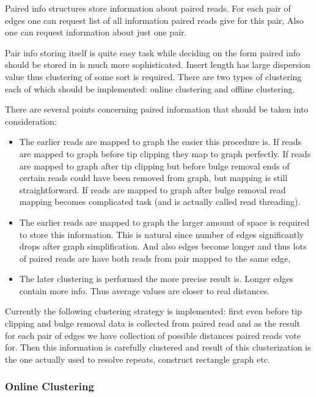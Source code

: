 \documentclass[12pt]{article}
\begin{document}
Paired info structures store information about paired reads. For each pair of edges one can request list of all information paired reads give for this pair, Also one can request information about just one pair.

Pair info storing itself is quite easy task while deciding on the form paired info should be stored in is much more sophisticated. Insert length has large dispersion value thus clustering of some sort is required. There are two types of clustering each of which should be implemented: online clustering and offline clustering.

There are several points concerning paired information that should be taken into consideration:

\begin{itemize}
\item The earlier reads are mapped to graph the easier this procedure is. If reads are mapped to graph before tip clipping they map to graph perfectly. If reads are mapped to graph after tip clipping but before bulge removal ends of certain reads could have been removed from graph, but mapping is still straightforward. If reads are mapped to graph after bulge removal read mapping becomes complicated task (and is actually called read threading).

\item The earlier reads are mapped to graph the larger amount of space is required to store this information. This is natural since number of edges significantly drops after graph simplification. And also edges become longer and thus lots of paired reads are have both reads from pair mapped to the same edge,

\item The later clustering is performed the more precise result is. Longer edges contain more info. Thus average values are closer to real distances.
\end{itemize}

Currently the following clustering strategy is implemented: first even before tip clipping and bulge removal data is collected from paired read and as the result for each pair of edges we have collection of possible distances paired reads vote for. Then this information is carefully clustered and result of this clusterization is the one actually used to resolve repeats, construct rectangle graph etc.

\subsubsection{Online Clustering}
\end{document}
